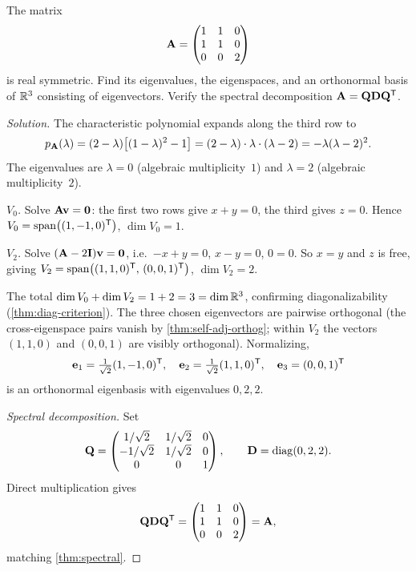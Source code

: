 \begin{problem}
\label{prob:spectral-3x3}
The matrix
\[
  \mathbf{A} = \begin{pmatrix}
    1 & 1 & 0 \\
    1 & 1 & 0 \\
    0 & 0 & 2
  \end{pmatrix}
\]
is real symmetric. Find its eigenvalues, the eigenspaces, and an
orthonormal basis of $\mathbb{R}^3$ consisting of eigenvectors. Verify the
spectral decomposition $\mathbf{A} = \mathbf{Q}\mathbf{D}\mathbf{Q}^{\mathsf{T}}$.
\end{problem}

\begin{proof}[Solution]
The characteristic polynomial expands along the third row to
\[
  p_{\mathbf{A}}(\lambda) = (2 - \lambda)\bigl[(1 - \lambda)^2 - 1\bigr]
  = (2 - \lambda) \cdot \lambda \cdot (\lambda - 2)
  = -\lambda(\lambda - 2)^2.
\]
The eigenvalues are $\lambda = 0$ (algebraic multiplicity~$1$) and
$\lambda = 2$ (algebraic multiplicity~$2$).

\emph{$V_0$.} Solve $\mathbf{A}\mathbf{v} = \mathbf{0}$: the first two rows
give $x + y = 0$, the third gives $z = 0$. Hence $V_0 = \operatorname{span}\bigl((1, -1, 0)^{\mathsf{T}}\bigr)$,
$\dim V_0 = 1$.

\emph{$V_2$.} Solve $(\mathbf{A} - 2\mathbf{I})\mathbf{v} = \mathbf{0}$, i.e.\
$-x + y = 0$, $x - y = 0$, $0 = 0$. So $x = y$ and $z$ is free,
giving $V_2 = \operatorname{span}\bigl((1, 1, 0)^{\mathsf{T}},\, (0, 0, 1)^{\mathsf{T}}\bigr)$,
$\dim V_2 = 2$.

The total $\dim V_0 + \dim V_2 = 1 + 2 = 3 = \dim \mathbb{R}^3$, confirming
diagonalizability (\cref{thm:diag-criterion}). The three chosen
eigenvectors are pairwise orthogonal (the cross-eigenspace pairs vanish
by \cref{thm:self-adj-orthog}; within $V_2$ the vectors $(1, 1, 0)$
and $(0, 0, 1)$ are visibly orthogonal). Normalizing,
\[
  \mathbf{e}_1 = \tfrac{1}{\sqrt{2}}(1, -1, 0)^{\mathsf{T}},\quad
  \mathbf{e}_2 = \tfrac{1}{\sqrt{2}}(1, 1, 0)^{\mathsf{T}},\quad
  \mathbf{e}_3 = (0, 0, 1)^{\mathsf{T}}
\]
is an orthonormal eigenbasis with eigenvalues $0, 2, 2$.

\emph{Spectral decomposition.} Set
\[
  \mathbf{Q} = \begin{pmatrix}
    1/\sqrt{2} & 1/\sqrt{2} & 0 \\
    -1/\sqrt{2} & 1/\sqrt{2} & 0 \\
    0 & 0 & 1
  \end{pmatrix}, \qquad
  \mathbf{D} = \operatorname{diag}(0, 2, 2).
\]
Direct multiplication gives
\[
  \mathbf{Q}\mathbf{D}\mathbf{Q}^{\mathsf{T}} = \begin{pmatrix}
    1 & 1 & 0 \\
    1 & 1 & 0 \\
    0 & 0 & 2
  \end{pmatrix} = \mathbf{A},
\]
matching \cref{thm:spectral}.
\end{proof}
